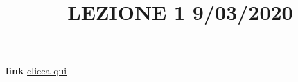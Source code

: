 \title{LEZIONE 1 9/03/2020}\newline
\textbf{link} \href{https://web.microsoftstream.com/video/6164a9b1-4d0a-4f37-a279-2e0ec1e8ca25?list=user&userId=faa91214-a6f5-40d7-8875-253fd49b8ce1}{clicca qui}
\section{}